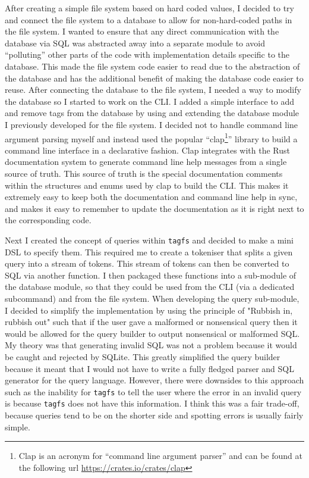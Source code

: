 After creating a simple file system based on hard coded values, I decided to
try and connect the file system to a database to allow for non-hard-coded paths
in the file system. I wanted to ensure that any direct communication with the
database via SQL was abstracted away into a separate module to avoid
``polluting'' other parts of the code with implementation details specific to
the database. This made the file system code easier to read due to the
abstraction of the database and has the additional benefit of making the
database code easier to reuse. After connecting the database to the file
system, I needed a way to modify the database so I started to work on the CLI.
I added a simple interface to add and remove tags from the database by using
and extending the database module I previously developed for the file system. I
decided not to handle command line argument parsing myself and instead used the
popular ``clap\footnote{Clap is an acronym for ``command line argument parser''
and can be found at the following url \url{https://crates.io/crates/clap}}''
library to build a command line interface in a declarative fashion. Clap
integrates with the Rust documentation system to generate command line help
messages from a single source of truth. This source of truth is the special
documentation comments within the structures and enums used by clap to build
the CLI. This makes it extremely easy to keep both the documentation and
command line help in sync, and makes it easy to remember to update the
documentation as it is right next to the corresponding code.

Next I created the concept of queries within \texttt{tagfs} and decided to make
a mini DSL to specify them. This required me to create a tokeniser that splits
a given query into a stream of tokens. This stream of tokens can then be
converted to SQL via another function. I then packaged these functions into a
sub-module of the database module, so that they could be used from the CLI (via
a dedicated subcommand) and from the file system. When developing the query
sub-module, I decided to simplify the implementation by using the principle of
"Rubbish in, rubbish out" such that if the user gave a malformed or nonsensical
query then it would be allowed for the query builder to output nonsensical or
malformed SQL. My theory was that generating invalid SQL was not a problem
because it would be caught and rejected by SQLite. This greatly simplified the
query builder because it meant that I would not have to write a fully fledged
parser and SQL generator for the query language. However, there were downsides
to this approach such as the inability for \texttt{tagfs} to tell the user
where the error in an invalid query is because \texttt{tagfs} does not have
this information. I think this was a fair trade-off, because queries tend to be
on the shorter side and spotting errors is usually fairly simple.

